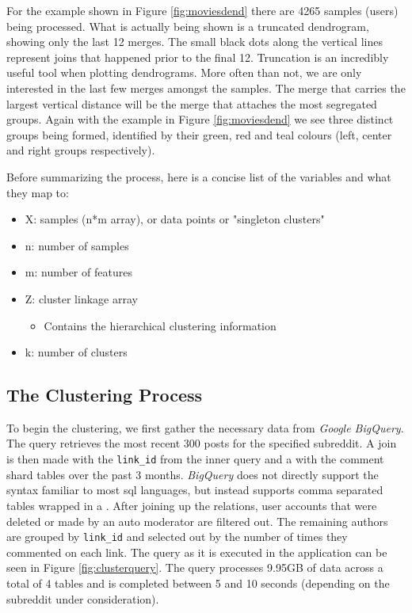 \documentclass[msc,oneside]{ubcthesis}%
\begin{document}
\par
For the example shown in Figure \ref{fig:moviesdend} there are 4265 samples (users) being processed. What is actually being shown is a truncated dendrogram, showing only the last 12 merges. The small black dots along the vertical lines represent joins that happened prior to the final 12. Truncation is an incredibly useful tool when plotting dendrograms. More often than not, we are only interested in the last few merges amongst the samples. The merge that carries the largest vertical distance will be the merge that attaches the most segregated groups. Again with the example in Figure \ref{fig:moviesdend} we see three distinct groups being formed, identified by their green, red and teal colours (left, center and right groups respectively).
\par
Before summarizing the process, here is a concise list of the variables and what they map to:
\begin{itemize}
\item{X: samples (n*m array), or data points or "singleton clusters"}
\item{n: number of samples}
\item{m: number of features}
\item{Z: cluster linkage array}
	\begin{itemize}
	\item{Contains the hierarchical clustering information}
	\end{itemize}
\item{k: number of clusters}
\end{itemize}
\par

\subsection{The Clustering Process}
To begin the clustering, we first gather the necessary data from \textit{Google BigQuery}. The query retrieves the most recent 300 posts for the specified subreddit. A join is then made with the \texttt{link\_id} from the inner query and a  with the comment shard tables over the past 3 months. \textit{BigQuery} does not directly support the  syntax familiar to most sql languages, but instead supports comma separated tables wrapped in a . After joining up the relations, user accounts that were deleted or made by an auto moderator are filtered out. The remaining authors are grouped by \texttt{link\_id} and selected out by the number of times they commented on each link. The query as it is executed in the application can be seen in Figure \ref{fig:clusterquery}. The query processes 9.95GB of data across a total of 4 tables and is completed between 5 and 10 seconds (depending on the subreddit under consideration).
\end{document}
